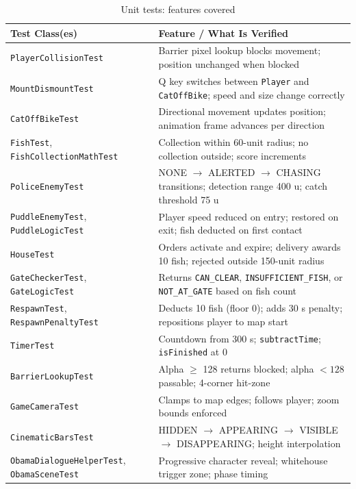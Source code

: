 \documentclass[12pt]{article}
\begin{document}
\renewcommand{\arraystretch}{1.5}
\begin{table}[H]
\centering
\footnotesize
\begin{tabular}{p{} p{}}
\toprule
\textbf{Test Class(es)} & \textbf{Feature / What Is Verified} \\
\midrule
\texttt{PlayerCollisionTest} & Barrier pixel lookup blocks movement; position unchanged when blocked \\
\texttt{MountDismountTest} & Q key switches between \texttt{Player} and \texttt{CatOffBike}; speed and size change correctly \\
\texttt{CatOffBikeTest} & Directional movement updates position; animation frame advances per direction \\
\texttt{FishTest}, \texttt{FishCollectionMathTest} & Collection within 60-unit radius; no collection outside; score increments \\
\texttt{PoliceEnemyTest} & NONE $\to$ ALERTED $\to$ CHASING transitions; detection range 400 u; catch threshold 75 u \\
\texttt{PuddleEnemyTest}, \texttt{PuddleLogicTest} & Player speed reduced on entry; restored on exit; fish deducted on first contact \\
\texttt{HouseTest} & Orders activate and expire; delivery awards 10 fish; rejected outside 150-unit radius \\
\texttt{GateCheckerTest}, \texttt{GateLogicTest} & Returns \texttt{CAN\_CLEAR}, \texttt{INSUFFICIENT\_FISH}, or \texttt{NOT\_AT\_GATE} based on fish count \\
\texttt{RespawnTest}, \texttt{RespawnPenaltyTest} & Deducts 10 fish (floor 0); adds 30 s penalty; repositions player to map start \\
\texttt{TimerTest} & Countdown from 300 s; \texttt{subtractTime}; \texttt{isFinished} at 0 \\
\texttt{BarrierLookupTest} & Alpha $\geq$ 128 returns blocked; alpha $< 128$ passable; 4-corner hit-zone \\
\texttt{GameCameraTest} & Clamps to map edges; follows player; zoom bounds enforced \\
\texttt{CinematicBarsTest} & HIDDEN $\to$ APPEARING $\to$ VISIBLE $\to$ DISAPPEARING; height interpolation \\
\texttt{ObamaDialogueHelperTest}, \texttt{ObamaSceneTest} & Progressive character reveal; whitehouse trigger zone; phase timing \\
\bottomrule
\end{tabular}
\caption{Unit tests: features covered}
\end{table}
\end{document}
